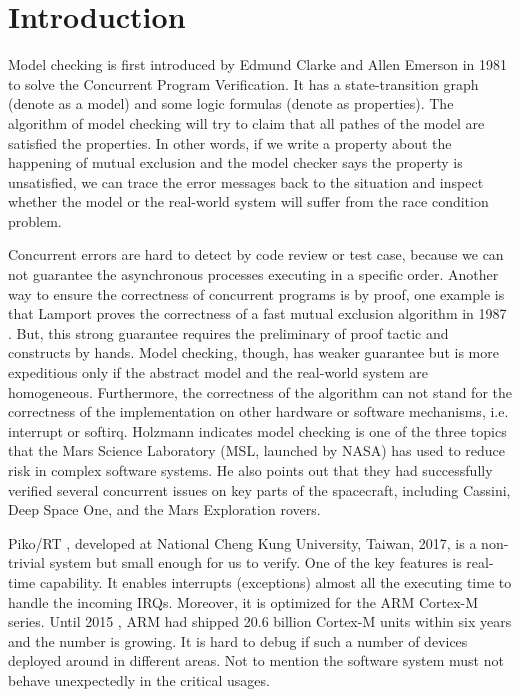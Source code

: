 \section{Introduction}
Model checking \cite{Clark:2000, Clarke:2008:BMC:1423535.1423536} is first introduced by Edmund Clarke and Allen Emerson in 1981 to solve the Concurrent Program Verification. It has a state-transition graph (denote as a model) and some logic formulas (denote as properties). The algorithm of model checking will try to claim that all pathes of the model are satisfied the properties. In other words, if we write a property about the happening of mutual exclusion and the model checker says the property is unsatisfied, we can trace the error messages back to the situation and inspect whether the model or the real-world system will suffer from the race condition problem.

Concurrent errors are hard to detect by code review or test case, because we can not guarantee the asynchronous processes executing in a specific order. Another way to ensure the correctness of concurrent programs is by proof, one example is that Lamport proves the correctness of a fast mutual exclusion algorithm in 1987 \cite{Lamport:1987:FME:7351.7352}. But, this strong guarantee requires the preliminary of proof tactic and constructs by hands. Model checking, though, has weaker guarantee but is more expeditious only if the abstract model and the real-world system are homogeneous. Furthermore, the correctness of the algorithm can not stand for the correctness of the implementation on other hardware or software mechanisms, i.e. interrupt or softirq. Holzmann \cite{Holzmann:2014:MC:2556647.2560218} indicates model checking is one of the three topics that the Mars Science Laboratory (MSL, launched by NASA) has used to reduce risk in complex software systems. He also points out that they had successfully verified several concurrent issues on key parts of the spacecraft, including Cassini, Deep Space One, and the Mars Exploration rovers.

Piko/RT \cite{PikoRT}, developed at National Cheng Kung University, Taiwan, 2017, is a non-trivial system but small enough for us to verify. One of the key features is real-time capability. It enables interrupts (exceptions) almost all the executing time to handle the incoming IRQs. Moreover, it is optimized for the ARM Cortex-M series. Until 2015 \cite{ARMProduct}, ARM had shipped 20.6 billion Cortex-M units within six years and the number is growing. It is hard to debug if such a number of devices deployed around in different areas. Not to mention the software system must not behave unexpectedly in the critical usages.

